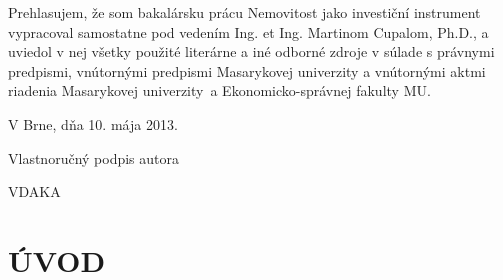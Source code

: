 \documentclass[12pt,twoside,openany]{fithesis}
\makeatletter
\def\cleardoublepage{\clearpage\if@twoside \ifodd\c@page\else
        \thispagestyle{empty}
        \hbox{}\newpage\if@twocolumn\hbox{}\newpage\fi\fi\fi}
\makeatother
\begin{document}
\begin{ThesisDeclaration} %

\vspace{40mm}

Prehlasujem, že som bakalársku prácu Nemovitost jako investiční instrument vypracoval samostatne pod vedením Ing. et Ing. Martinom Cupalom, Ph.D., a uviedol v nej všetky použité literárne a iné odborné zdroje v súlade s právnymi predpismi, vnútornými predpismi Masarykovej univerzity a vnútornými aktmi riadenia Masarykovej univerzity~a Ekonomicko-správnej fakulty MU.

\vspace{20mm}

V Brne, dňa 10. mája 2013. \hspace{40mm}\hrulefill 

\hspace{95mm} Vlastnoručný podpis autora

\end{ThesisDeclaration}

\begin{ThesisThanks} %

\vspace{40mm}

VDAKA

\end{ThesisThanks}
\normalsize







\tableofcontents %

	\MainMatter						
									\cleardoublepage\chapter*{\uppercase{Úvod}}
{}
\markright{\contentsname}
\end{document}
